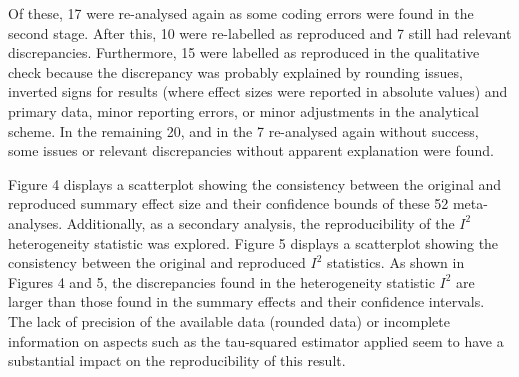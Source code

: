 \documentclass[
  ,jou, a4paper,floatsintext]{apa6}
\begin{document}
Of these, 17 were re-analysed again as some coding errors were found in the second stage. After this, 10 were re-labelled as reproduced and 7 still had relevant discrepancies. Furthermore, 15 were labelled as reproduced in the qualitative check because the discrepancy was probably explained by rounding issues, inverted signs for results (where effect sizes were reported in absolute values) and primary data, minor reporting errors, or minor adjustments in the analytical scheme. In the remaining 20, and in the 7 re-analysed again without success, some issues or relevant discrepancies without apparent explanation were found.

Figure 4 displays a scatterplot showing the consistency between the original and reproduced summary effect size and their confidence bounds of these 52 meta-analyses.
Additionally, as a secondary analysis, the reproducibility of the \(I^2\) heterogeneity statistic was explored. Figure 5 displays a scatterplot showing the consistency between the original and reproduced \(I^2\) statistics. As shown in Figures 4 and 5, the discrepancies found in the heterogeneity statistic \(I^2\) are larger than those found in the summary effects and their confidence intervals. The lack of precision of the available data (rounded data) or incomplete information on aspects such as the tau-squared estimator applied seem to have a substantial impact on the reproducibility of this result.
\end{document}
